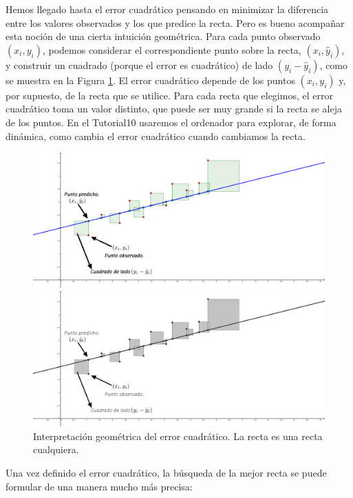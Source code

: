 Hemos llegado hasta el error cuadrático pensando en minimizar la diferencia entre los valores observados y los que predice la recta. Pero es bueno acompañar esta noción de una cierta intuición geométrica. Para cada punto observado $(x_i,y_i)$, podemos considerar el correspondiente punto sobre la recta, $(x_i,\hat y_i)$, y construir un cuadrado (porque el error es cuadrático) de lado $(y_i-\hat y_i)$, como se muestra en la Figura \ref{cap10:fig:InterpretacionErrorCuadratico}. El error cuadrático depende de los puntos $(x_i,y_i)$ y, por supuesto, de la recta
que se utilice. Para cada recta que elegimos, el error cuadrático toma un valor distinto, que puede ser muy grande si la recta se aleja de los puntos. En el Tutorial10 usaremos el ordenador para explorar, de forma dinámica, como cambia el error cuadrático cuando cambiamos la recta.

\begin{figure}[htbp]
\begin{center}
\begin{enColor}
\includegraphics[width=14cm]{../fig/Cap10-InterpretacionErrorCuadratico.png}
\end{enColor}
\begin{bn}
\includegraphics[width=14cm]{../fig/Cap10-InterpretacionErrorCuadratico-bn.png}
\end{bn}
\caption{Interpretación geométrica del error cuadrático. La recta es una recta cualquiera.}
\label{cap10:fig:InterpretacionErrorCuadratico}
\end{center}
\end{figure}
Una vez definido el error cuadrático,  la búsqueda de la mejor recta se puede formular de una manera mucho más precisa:

